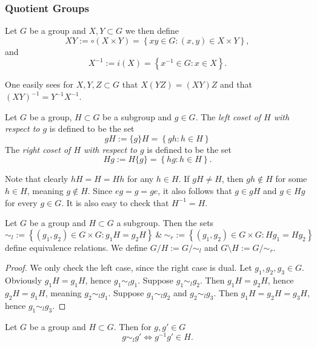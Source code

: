 \subsubsection{Quotient Groups}
\begin{definition}
    Let $G$ be a group and $X,Y\subset G$ we then define 
    $$XY := \circ (X\times Y) = \left\{xy \in G : (x,y)\in X\times Y \right\},$$
    and 
    $$X^{-1} := i(X) = \left\{ x^{-1} \in G : x \in X \right\}.$$
\end{definition}
\begin{remark}\label{AssociativityOfMultiplicationSets}
    One easily sees for $X,Y,Z\subset G$ that $X(YZ) = (XY)Z$ and that $(XY)^{-1} = Y^{-1}X^{-1}$.
\end{remark}
\begin{definition}
    Let $G$ be a group, $H\subset G$ be a subgroup and $g\in G$. The \textit{left coset of $H$ with respect to $g$} is defined to be the set 
    $$gH := \{g\}H =  \left\{ gh : h\in H \right\}$$
    The \textit{right coset of $H$ with respect to $g$} is defined to be the set
    $$Hg := H\{g\} =  \left\{ hg : h\in H\right\}.$$
\end{definition}
\begin{remark}\label{StabOfSubgroupIsSubgroup}
    Note that clearly $hH = H = Hh$ for any $h\in H$. If $gH \neq H$, then $gh \notin H$ for some $h\in H$, meaning $g \notin H$. Since $eg = g = ge$, it also follows that $g\in gH$ and $g\in Hg$ for every $g\in G$. It is also easy to check that $H^{-1}=H$.
\end{remark}
\begin{proposition}
    Let $G$ be a group and $H\subset G$ a subgroup. Then the sets 
    $$\sim_l := \left\{ (g_1,g_2)\in G\times G : g_1H = g_2H \right\} \ \& \ \sim_r := \left\{ (g_1,g_2)\in G\times G : Hg_1 = Hg_2 \right\}$$
    define equivalence relations. We define $G/H := G/\sim_l$ and $G\setminus H := G/\sim_r$.
\end{proposition}
\begin{proof}
    We only check the left case, since the right case is dual. Let $g_1,g_2,g_3\in G$. Obviously $g_1H = g_1H$, hence $g_1\sim_l g_1$. Suppose $g_1\sim_l g_2$. Then $g_1H = g_2H$, hence $g_2H=g_1H$, meaning $g_2\sim_l g_1$. Suppose $g_1\sim_l g_2$ and $g_2\sim_l g_3$. Then $g_1H = g_2H = g_3H$, hence $g_1\sim_l g_3$. 
\end{proof}
\begin{lemma}
    Let $G$ be a group and $H\subset G$. Then for $g,g'\in G$
    $$g\sim_l g' \iff g^{-1}g'\in H.$$
\end{lemma}

